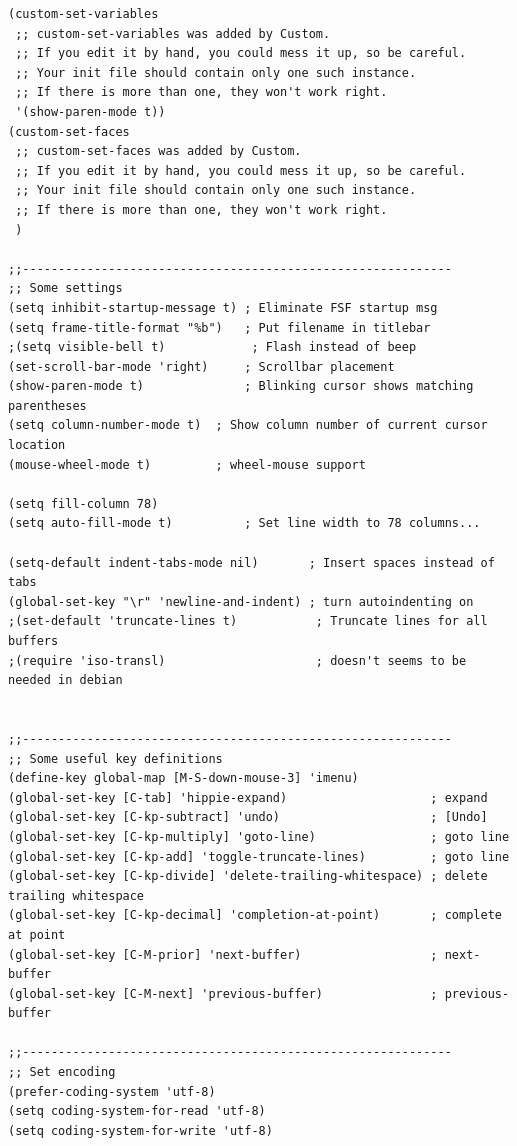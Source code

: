\documentclass[12pt,spanish,]{scrartcl}
\begin{document}
\begin{verbatim}
(custom-set-variables
 ;; custom-set-variables was added by Custom.
 ;; If you edit it by hand, you could mess it up, so be careful.
 ;; Your init file should contain only one such instance.
 ;; If there is more than one, they won't work right.
 '(show-paren-mode t))
(custom-set-faces
 ;; custom-set-faces was added by Custom.
 ;; If you edit it by hand, you could mess it up, so be careful.
 ;; Your init file should contain only one such instance.
 ;; If there is more than one, they won't work right.
 )

;;------------------------------------------------------------
;; Some settings
(setq inhibit-startup-message t) ; Eliminate FSF startup msg
(setq frame-title-format "%b")   ; Put filename in titlebar
;(setq visible-bell t)            ; Flash instead of beep
(set-scroll-bar-mode 'right)     ; Scrollbar placement
(show-paren-mode t)              ; Blinking cursor shows matching parentheses
(setq column-number-mode t)  ; Show column number of current cursor location
(mouse-wheel-mode t)         ; wheel-mouse support

(setq fill-column 78)
(setq auto-fill-mode t)          ; Set line width to 78 columns...

(setq-default indent-tabs-mode nil)       ; Insert spaces instead of tabs
(global-set-key "\r" 'newline-and-indent) ; turn autoindenting on
;(set-default 'truncate-lines t)           ; Truncate lines for all buffers
;(require 'iso-transl)                     ; doesn't seems to be needed in debian


;;------------------------------------------------------------
;; Some useful key definitions
(define-key global-map [M-S-down-mouse-3] 'imenu)
(global-set-key [C-tab] 'hippie-expand)                    ; expand
(global-set-key [C-kp-subtract] 'undo)                     ; [Undo] 
(global-set-key [C-kp-multiply] 'goto-line)                ; goto line
(global-set-key [C-kp-add] 'toggle-truncate-lines)         ; goto line
(global-set-key [C-kp-divide] 'delete-trailing-whitespace) ; delete trailing whitespace
(global-set-key [C-kp-decimal] 'completion-at-point)       ; complete at point
(global-set-key [C-M-prior] 'next-buffer)                  ; next-buffer
(global-set-key [C-M-next] 'previous-buffer)               ; previous-buffer

;;------------------------------------------------------------
;; Set encoding
(prefer-coding-system 'utf-8)
(setq coding-system-for-read 'utf-8)
(setq coding-system-for-write 'utf-8)


\end{verbatim}
\end{document}
